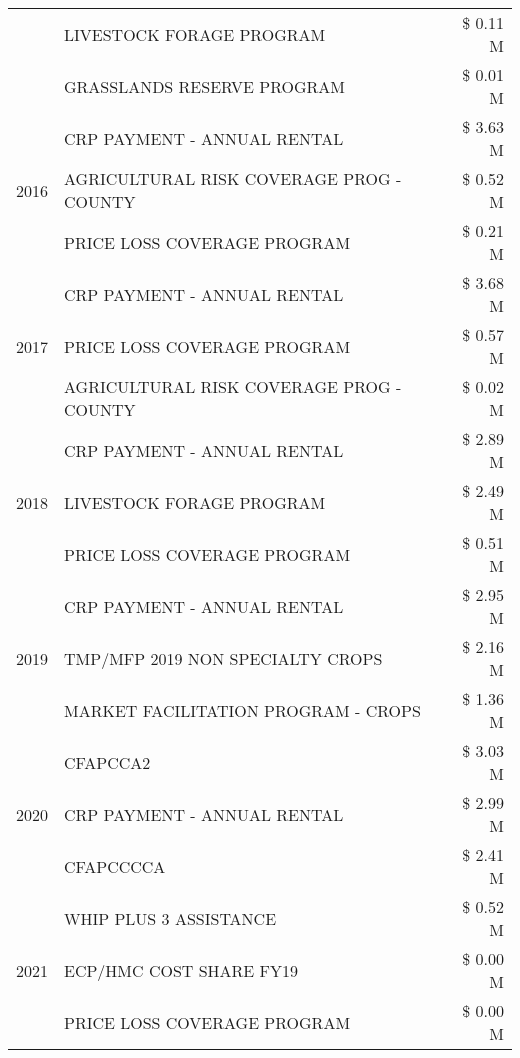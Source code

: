 \begin{tabular}{llr}
 & LIVESTOCK FORAGE PROGRAM & \$ 0.11 M \\
 & GRASSLANDS RESERVE PROGRAM & \$ 0.01 M \\
\cline{1-3}
\multirow[t]{3}{*}{2016} & CRP PAYMENT - ANNUAL RENTAL & \$ 3.63 M \\
 & AGRICULTURAL RISK COVERAGE PROG - COUNTY & \$ 0.52 M \\
 & PRICE LOSS COVERAGE PROGRAM & \$ 0.21 M \\
\cline{1-3}
\multirow[t]{3}{*}{2017} & CRP PAYMENT - ANNUAL RENTAL & \$ 3.68 M \\
 & PRICE LOSS COVERAGE PROGRAM & \$ 0.57 M \\
 & AGRICULTURAL RISK COVERAGE PROG - COUNTY & \$ 0.02 M \\
\cline{1-3}
\multirow[t]{3}{*}{2018} & CRP PAYMENT - ANNUAL RENTAL & \$ 2.89 M \\
 & LIVESTOCK FORAGE PROGRAM & \$ 2.49 M \\
 & PRICE LOSS COVERAGE PROGRAM & \$ 0.51 M \\
\cline{1-3}
\multirow[t]{3}{*}{2019} & CRP PAYMENT - ANNUAL RENTAL & \$ 2.95 M \\
 & TMP/MFP 2019 NON SPECIALTY CROPS & \$ 2.16 M \\
 & MARKET FACILITATION PROGRAM - CROPS & \$ 1.36 M \\
\cline{1-3}
\multirow[t]{3}{*}{2020} & CFAPCCA2 & \$ 3.03 M \\
 & CRP PAYMENT - ANNUAL RENTAL & \$ 2.99 M \\
 & CFAPCCCCA & \$ 2.41 M \\
\cline{1-3}
\multirow[t]{3}{*}{2021} & WHIP PLUS 3 ASSISTANCE & \$ 0.52 M \\
 & ECP/HMC COST SHARE FY19 & \$ 0.00 M \\
 & PRICE LOSS COVERAGE PROGRAM & \$ 0.00 M \\
\cline{1-3}
\bottomrule
\end{tabular}
